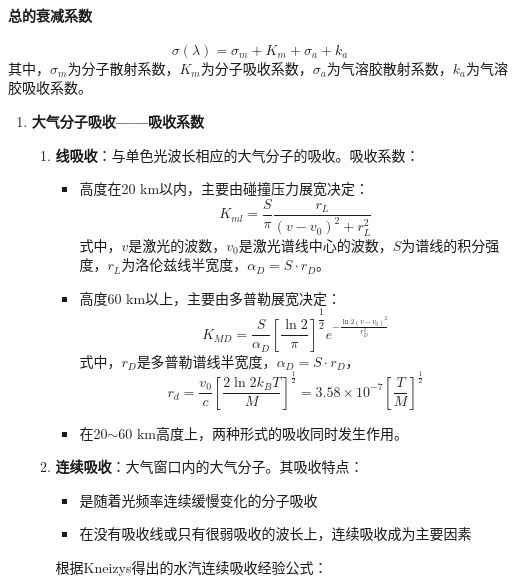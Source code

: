 \paragraph{总的衰减系数}
\begin{equation}
\sigma(\lambda) = \sigma_m + K_m + \sigma_a + k_a
\end{equation}
其中，$ \sigma_m $为分子散射系数，$ K_m $为分子吸收系数，$ \sigma_a $为气溶胶散射系数，$ k_a $为气溶胶吸收系数。
\begin{enumerate}
	\item \textbf{大气分子吸收——吸收系数}
		\begin{enumerate}
			\item \textbf{线吸收}：与单色光波长相应的大气分子的吸收。吸收系数：
				\begin{itemize}
					\item 高度在20 km以内，主要由碰撞压力展宽决定：
						\begin{equation}
						K_{ml} = \dfrac{S}{\pi}\dfrac{r_L}{(v-v_0)^2 + r_L^2}
						\end{equation}
						式中，$ v $是激光的波数，$ v_0 $是激光谱线中心的波数，$ S $为谱线的积分强度，$ r_L $为洛伦兹线半宽度，$ \alpha_D = S \cdot r_D $。
					\item 高度60 km以上，主要由多普勒展宽决定：
						\begin{equation}
						K_{MD} = \dfrac{S}{\alpha_D}\left[\dfrac{\ln 2}{\pi}\right]^{\dfrac{1}{2}} e^{-\frac{\ln 2(v-v_0)^2}{r_D^2}}
						\end{equation}
						式中，$ r_D $是多普勒谱线半宽度，$ \alpha_D = S \cdot r_D $，
						\begin{equation}
						r_d = \dfrac{v_0}{c}\left[\dfrac{2\ln 2k_BT}{M}\right]^{\frac{1}{2}} = 3.58 \times 10^{-7} \left[\dfrac{T}{M}\right] ^ {\frac{1}{2}}
						\end{equation}
					\item 在20$ \sim $60 km高度上，两种形式的吸收同时发生作用。
				\end{itemize} %
			\item \textbf{连续吸收}：大气窗口内的大气分子。其吸收特点：
				\begin{itemize}
					\item 是随着光频率连续缓慢变化的分子吸收
					\item 在没有吸收线或只有很弱吸收的波长上，连续吸收成为主要因素
				\end{itemize}
				根据Kneizys得出的水汽连续吸收经验公式：
				\begin{itemize}

\end{itemize}
\end{enumerate}
\end{enumerate}
